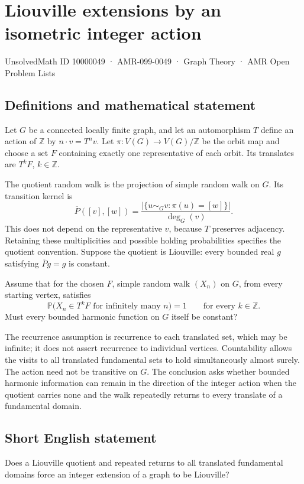 \documentclass[11pt,a4paper]{article}
\begin{document}
\section*{Liouville extensions by an isometric integer action}\label{10000049}
{\small UnsolvedMath ID 10000049 · AMR-099-0049 · Graph Theory · AMR Open Problem Lists}
\subsection{Definitions and mathematical statement}
Let $G$ be a connected locally finite graph, and let an automorphism $T$ define an action of $\mathbb Z$ by $n\cdot v=T^nv$. Let $\pi:V(G)\to V(G)/\mathbb Z$ be the orbit map and choose a set $F$ containing exactly one representative of each orbit. Its translates are $T^kF$, $k\in\mathbb Z$.

The quotient random walk is the projection of simple random walk on $G$. Its transition kernel is
\[
\overline P([v],[w])=
\frac{|\{u\sim_Gv:\pi(u)=[w]\}|}{\deg_G(v)}.
\]
This does not depend on the representative $v$, because $T$ preserves adjacency. Retaining these multiplicities and possible holding probabilities specifies the quotient convention. Suppose the quotient is Liouville: every bounded real $g$ satisfying $\overline Pg=g$ is constant.

Assume that for the chosen $F$, simple random walk $(X_n)$ on $G$, from every starting vertex, satisfies
\[
\mathbb P\bigl(X_n\in T^kF\text{ for infinitely many }n\bigr)=1
\qquad\text{for every }k\in\mathbb Z.
\]
Must every bounded harmonic function on $G$ itself be constant?

The recurrence assumption is recurrence to each translated set, which may be infinite; it does not assert recurrence to individual vertices. Countability allows the visits to all translated fundamental sets to hold simultaneously almost surely. The action need not be transitive on $G$. The conclusion asks whether bounded harmonic information can remain in the direction of the integer action when the quotient carries none and the walk repeatedly returns to every translate of a fundamental domain.
\subsection{Short English statement}
Does a Liouville quotient and repeated returns to all translated fundamental domains force an integer extension of a graph to be Liouville?
\end{document}

